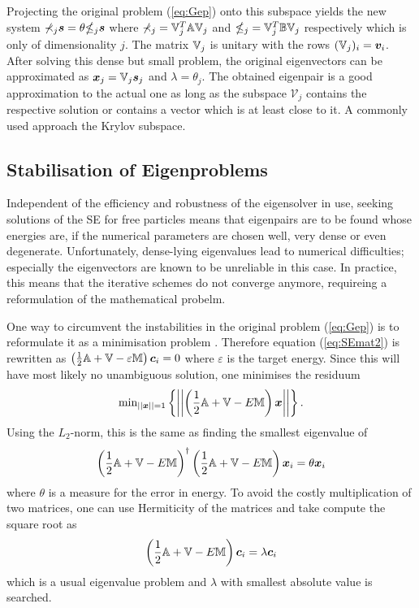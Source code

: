Projecting the original problem (\ref{eq:Gep}) onto this subspace yields the new system $\mathbb{\Sigma}_j \bm{s}=\theta\mathbb{\Theta}_j\bm{s}$ where $\mathbb{\Sigma}_j=\mathbb{V}_j^T\mathbb{A}\mathbb{V}_j$ and $\mathbb{\Theta}_j=\mathbb{V}_j^T\mathbb{B}\mathbb{V}_j$ respectively which is only of dimensionality $j$.
The matrix $\mathbb{V}_j$ is unitary with the rows $(\mathbb{V}_j)_i=\bm{v}_i$.
After solving this dense but small problem, the original eigenvectors can be approximated as $\bm{x}_j=\mathbb{V}_j\bm{s}_j$ and $\lambda=\theta_j$.
The obtained eigenpair is a good approximation to the actual one as long as the subspace $\mathcal{V}_j$ contains the respective solution or contains a vector which is at least close to it.
A commonly used approach the Krylov subspace.

\subsection{Stabilisation of Eigenproblems}
\label{ch:regular}
Independent of the efficiency and robustness of the eigensolver in use, seeking solutions of the SE for free particles means that eigenpairs are to be found whose energies are, if the numerical parameters are chosen well, very dense or even degenerate.
Unfortunately, dense-lying eigenvalues lead to numerical difficulties; especially the eigenvectors are known to be unreliable in this case.
In practice, this means that the iterative schemes do not converge anymore, requireing a reformulation of the mathematical probelm.

One way to circumvent the instabilities in the original problem (\ref{eq:Gep}) is to reformulate it as a minimisation problem \cite{H2pDeCleva}.
Therefore equation (\ref{eq:SEmat2}) is rewritten as $\left(\frac 12 \mathbb{A}+\mathbb{V} - \varepsilon \mathbb{M}\right)\bm{c}_i = 0$ where $\varepsilon$ is the target energy.
Since this will have most likely no unambiguous solution, one minimises the residuum
\begin{equation}
\text{min}_{||\bm{x}||=1}\left\{\left|\left|\left(\frac 12 \mathbb{A}+\mathbb{V}-E\mathbb{M}\right)\bm{x} \right|\right| \right\}.
\end{equation}
Using the $L_2$-norm, this is the same as finding the smallest eigenvalue of
\begin{equation}
\left(\frac 12 \mathbb{A}+\mathbb{V}-E\mathbb{M}\right)^\dagger
\left(\frac 12 \mathbb{A}+\mathbb{V}-E\mathbb{M}\right) \bm{x}_i = \theta \bm{x}_i
\end{equation}
where $\theta$ is a measure for the error in energy.
To avoid the costly multiplication of two matrices, one can use  Hermiticity of the matrices and take compute the
square root as
\begin{equation} \label{eq:SEmin}
\left(\frac 12 \mathbb{A}+\mathbb{V}-E\mathbb{M}\right)\bm{c}_i = \lambda \bm{c}_i
\end{equation}
which is a usual eigenvalue problem \cite{H2pDeCleva} and $\lambda$ with smallest absolute value is searched.

